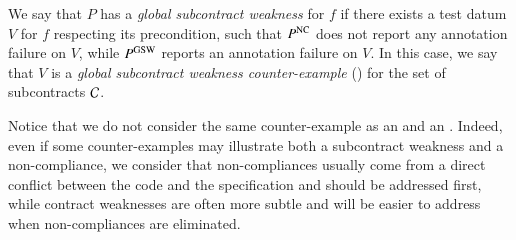 \begin{figure}[tb]
  \begin{minipage}{0.5\columnwidth}
    
  \end{minipage}
  \begin{minipage}{0.5\columnwidth}
    
  \end{minipage}
\end{figure}

\begin{definition} 
\label{def:GSW}
We say that $P$ has a \emph{global subcontract weakness} for $f$ 
if there exists a test datum $V$ for $f$ respecting its precondition,
such that $P^{\mathrm{NC}}$ does not report any annotation failure on $V$,
while $P^{\mathrm{GSW}}$ reports an annotation failure on $V$.
In this case, we say that $V$ is a 
\emph{global subcontract weakness counter-example} (\GSWCE)
for the set  of subcontracts ${\mathcal{C}}$.
\end{definition}

Notice that we do not consider the same counter-example as an \NCCE  and 
an \SWCE. Indeed, even if some counter-examples may illustrate both a
subcontract weakness and a non-compliance, we consider that
non-compliances usually come
from a direct conflict between the code and the specification
and should be addressed first, while 
contract weaknesses are often more subtle and will be
easier to address when non-compliances are eliminated.

